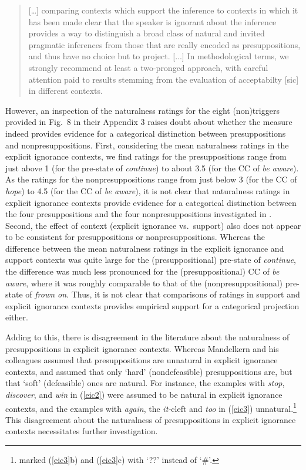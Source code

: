 \documentclass[11pt,fleqn]{article}
\newcommand{\6}{\mbox{$[\hspace*{-.6mm}[$}}
\newcommand{\9}{\mbox{$]\hspace*{-.6mm}]$}}
\begin{document}
\begin{quote}

[\ldots] comparing contexts which support the inference to contexts in which it has been made clear that the speaker is ignorant about the inference provides a way to distinguish a broad class of natural and invited pragmatic inferences from those that are really encoded as presuppositions, and thus have no choice but to project. [...]  In methodological terms, we strongly recommend at least a two-pronged approach, with careful attention paid to results stemming from the evaluation of acceptabilty [sic] in different contexts.

\end{quote}

However, an inspection of the naturalness ratings for the eight (non)triggers provided in Fig.~8 in their Appendix 3 raises doubt about whether the measure indeed provides evidence for a categorical distinction between presuppositions and nonpresuppositions. First, considering the mean naturalness ratings in the explicit ignorance contexts, we find ratings for the presuppositions range from just above 1 (for the pre-state of {\em continue}) to about 3.5 (for the CC of {\em be aware}). As the ratings for the nonpresuppositions range from just below 3 (for the CC of {\em hope}) to 4.5 (for the CC of {\em be aware}), it is not clear that naturalness ratings in explicit ignorance contexts provide evidence for a categorical distinction between the four presuppositions and the four nonpresuppositions investigated in \citealt{mandelkern-etal2020}. Second, the effect of context (explicit ignorance vs.\ support) also does not appear to be consistent for presuppositions or nonpresuppositions. Whereas the difference between the mean naturalness ratings in the explicit ignorance and support contexts was quite large for the (presuppositional) pre-state of {\em continue}, the difference was much less pronounced for the (presuppositional) CC of {\em be aware}, where it was roughly comparable to that of the (nonpresuppositional) pre-state of {\em frown on}. Thus, it is not clear that comparisons of ratings in support and explicit ignorance contexts provides empirical support for a categorical projection either. 

Adding to this, there is disagreement in the literature about the naturalness of presuppositions in explicit ignorance contexts. Whereas Mandelkern and his colleagues assumed that presuppositions are unnatural in explicit ignorance contexts, \citealt{simons01} and \citealt{abusch10} assumed that only `hard' (nondefeasible) presuppositions are, but that `soft' (defeasible) ones are natural. For instance,  the examples with {\em stop}, {\em discover}, and {\em win} in (\ref{eic2}) were assumed to be natural in explicit ignorance contexts, and the examples with {\em again}, the {\em it-}cleft and {\em too} in (\ref{eic3}) unnatural.\footnote{\citealt{abusch10} marked (\ref{eic3}b) and (\ref{eic3}c) with `??' instead of `$\#$'.} This disagreement about the naturalness of presuppositions in explicit ignorance contexts necessitates further investigation.
\end{document}
